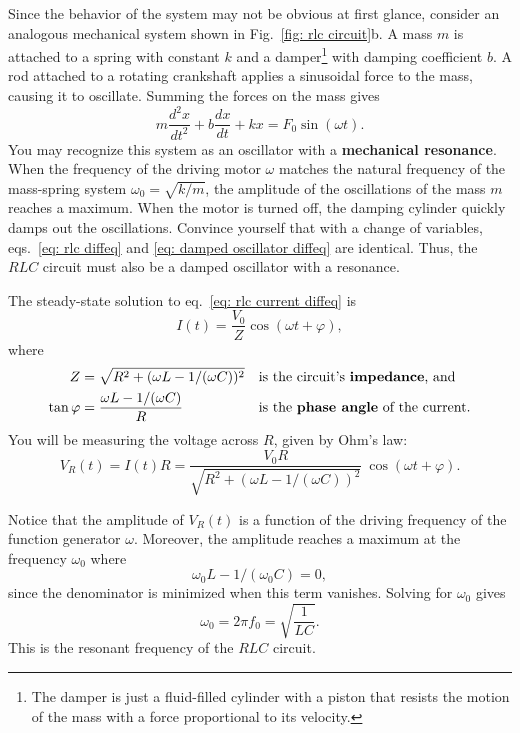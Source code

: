 \documentclass[addpoints]{physlabs}
\begin{document}
\begin{labsection}
\begin{theory}
    Since the behavior of the system may not be obvious at first glance, consider an analogous mechanical system shown in Fig.~\ref{fig: rlc circuit}b. A mass $m$ is attached to a spring with constant $k$ and a damper\footnote{The damper is just a fluid-filled cylinder with a piston that resists the motion of the mass with a force proportional to its velocity.} with damping coefficient $b$. A rod attached to a rotating crankshaft applies a sinusoidal force to the mass, causing it to oscillate. Summing the forces on the mass gives
    \begin{equation}\label{eq: damped oscillator diffeq}
        m\frac{d^2x}{dt^2} + b\frac{dx}{dt} + kx = F_0\sin{(\omega t)}.
    \end{equation}
    You may recognize this system as an oscillator with a  \textbf{mechanical resonance}. When the frequency of the driving motor $\omega$ matches the natural frequency of the mass-spring system $\omega_0=\sqrt{k/m}$, the amplitude of the oscillations of the mass $m$ reaches a maximum. When the motor is turned off, the damping cylinder quickly damps out the oscillations. Convince yourself that with a change of variables, eqs.~\ref{eq: rlc diffeq} and \ref{eq: damped oscillator diffeq} are identical. Thus, the $RLC$ circuit must also be a damped oscillator with a resonance.

    The steady-state solution to eq.~\ref{eq: rlc current diffeq} is
    \begin{equation}
        I(t) = \frac{V_0}{Z}\cos{(\omega t + \varphi)},
    \end{equation}
    where
    \begin{align}
        Z &= \sqrt{R^2 + (\omega L - 1/(\omega C))^2}
        & &\text{is the circuit's \textbf{impedance}, and}
        \\
        \tan{\varphi} &= \frac{\omega L - 1/(\omega C)}{R}
        & &\text{is the \textbf{phase angle} of the current.}
    \end{align}
    You will be measuring the voltage across $R$, given by Ohm's law:
    \begin{equation}\label{eq: rlc resistor voltage}
        V_R(t) = I(t)R = \frac{V_0R}{\sqrt{R^2 + (\omega L - 1/(\omega C))^2}}~\cos{(\omega t + \varphi)}.
    \end{equation}

    Notice that the amplitude of $V_R(t)$ is a function of the driving frequency of the function generator $\omega$. Moreover, the amplitude reaches a maximum at the frequency $\omega_0$ where
    \[
        \omega_0 L - 1/(\omega_0 C) = 0,
    \]
    since the denominator is minimized when this term vanishes. Solving for $\omega_0$ gives
    \begin{equation}
        \omega_0 = 2\pi f_0 = \sqrt{\frac{1}{LC}}.
    \end{equation}
    This is the resonant frequency of the $RLC$ circuit.


\end{theory}
\end{labsection}
\end{document}
